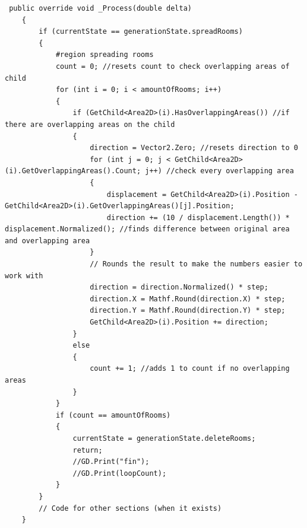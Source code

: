 \documentclass{article}
\begin{document}
\begin{lstlisting}
 public override void _Process(double delta)
    {
        if (currentState == generationState.spreadRooms)
        {
            #region spreading rooms
            count = 0; //resets count to check overlapping areas of child
            for (int i = 0; i < amountOfRooms; i++)
            {
                if (GetChild<Area2D>(i).HasOverlappingAreas()) //if there are overlapping areas on the child
                {
                    direction = Vector2.Zero; //resets direction to 0
                    for (int j = 0; j < GetChild<Area2D>(i).GetOverlappingAreas().Count; j++) //check every overlapping area
                    {
                        displacement = GetChild<Area2D>(i).Position - GetChild<Area2D>(i).GetOverlappingAreas()[j].Position;
                        direction += (10 / displacement.Length()) * displacement.Normalized(); //finds difference between original area and overlapping area
                    }
                    // Rounds the result to make the numbers easier to work with
                    direction = direction.Normalized() * step;
                    direction.X = Mathf.Round(direction.X) * step;
                    direction.Y = Mathf.Round(direction.Y) * step;
                    GetChild<Area2D>(i).Position += direction;
                }
                else
                {
                    count += 1; //adds 1 to count if no overlapping areas
                }
            }
            if (count == amountOfRooms)
            {
                currentState = generationState.deleteRooms;
                return;
                //GD.Print("fin");
                //GD.Print(loopCount);
            }
		}
		// Code for other sections (when it exists)
	}
\end{lstlisting}
\end{document}
